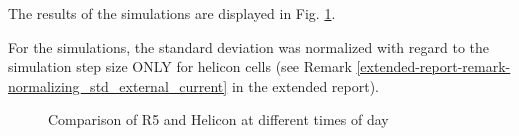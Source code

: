\documentclass[../../report.tex]{subfiles}
\begin{document}
The results of the simulations are displayed in Fig. \ref{fig_example_single_helicon_r5_day_night}.

\begin{remark}
    For the simulations, the standard deviation was normalized with regard to the simulation step size ONLY for helicon cells (see Remark \ref{extended-report-remark-normalizing_std_external_current} in the extended report).
\end{remark}

\begin{note}
    
\end{note}

\begin{figure}[!hb]\label{fig_example_single_helicon_r5_day_night}
    \centering
    \caption{Comparison of R5 and Helicon at different times of day}
\end{figure}

\FloatBarrier
\end{document}
